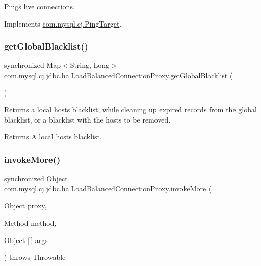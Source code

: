 Pings live connections. 

Implements \mbox{\hyperlink{interfacecom_1_1mysql_1_1cj_1_1_ping_target}{com.\+mysql.\+cj.\+Ping\+Target}}.

\mbox{\label{classcom_1_1mysql_1_1cj_1_1jdbc_1_1ha_1_1_load_balanced_connection_proxy_a166490bbe3865b511ff7df42813a97d8}} 
\subsubsection{\texorpdfstring{get\+Global\+Blacklist()}{getGlobalBlacklist()}}
{\footnotesize\ttfamily synchronized Map$<$String, Long$>$ com.\+mysql.\+cj.\+jdbc.\+ha.\+Load\+Balanced\+Connection\+Proxy.\+get\+Global\+Blacklist (\begin{DoxyParamCaption}{ }\end{DoxyParamCaption})}

Returns a local hosts blacklist, while cleaning up expired records from the global blacklist, or a blacklist with the hosts to be removed.

\begin{DoxyReturn}{Returns}
A local hosts blacklist. 
\end{DoxyReturn}
\mbox{\label{classcom_1_1mysql_1_1cj_1_1jdbc_1_1ha_1_1_load_balanced_connection_proxy_a77ff10a73000704f3d23fbe59510bab4}} 
\subsubsection{\texorpdfstring{invoke\+More()}{invokeMore()}}
{\footnotesize\ttfamily synchronized Object com.\+mysql.\+cj.\+jdbc.\+ha.\+Load\+Balanced\+Connection\+Proxy.\+invoke\+More (\begin{DoxyParamCaption}\item[{Object}]{proxy,  }\item[{Method}]{method,  }\item[{Object \mbox{[}$\,$\mbox{]}}]{args }\end{DoxyParamCaption}) throws Throwable}

